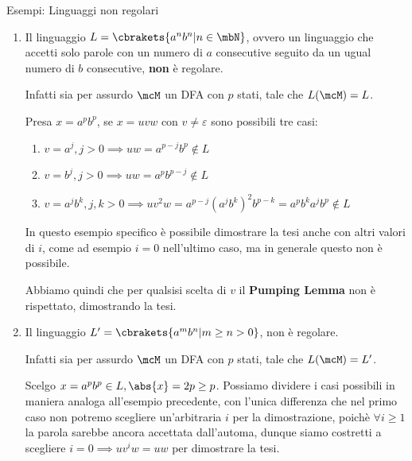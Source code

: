 \begin{generalbox}[colframe=azure-gradient-3!90!black]{Esempi: Linguaggi non regolari}

  \begin{enumerate}
    \item Il linguaggio \(L = \cbrakets{a^{n}b^n \vert n \in \mbN}\), ovvero un linguaggio che accetti solo parole con un numero di \(a\) consecutive seguito da un ugual numero di \(b\) consecutive, \textbf{non} è regolare.

          \medskip

          Infatti sia per assurdo \(\mcM\) un DFA con \(p\) stati, tale che \(L(\mcM)=L\).

          \medskip

          Presa \(x=a^{p}b^p\), se \(x=uvw\) con \(v\neq \varepsilon\) sono possibili tre casi:
          \begin{enumerate}
            \item \(v=a^j, j>0 \implies uw=a^{p-j}b^p \nin L\)
            \item \(v=b^j, j>0 \implies uw=a^{p}b^{p-j} \nin L\)
            \item \(v=a^{j}b^k, j,k>0 \implies uv^2w = a^{p-j}{(a^{j}b^k)}^2b^{p-k}=a^{p}b^{k}a^{j}b^p \nin L\)
          \end{enumerate}

          \medskip

          In questo esempio specifico è possibile dimostrare la tesi anche con altri valori di \(i\), come ad esempio \(i=0\) nell'ultimo caso, ma in generale questo non è possibile.

          \medskip

          Abbiamo quindi che per qualsisi scelta di \(v\) il \textbf{Pumping Lemma} non è rispettato, dimostrando la tesi.

          \medskip

    \item Il linguaggio \(L' = \cbrakets{a^{m}b^n \vert m \geq n > 0}\), non è regolare.

          \medskip

          Infatti sia per assurdo \(\mcM\) un DFA con \(p\) stati, tale che \(L(\mcM)=L'\).

          \medskip

          Scelgo \(x=a^{p}b^{p} \in L, \abs{x}=2p\geq p\). Possiamo dividere i casi possibili in maniera analoga all'esempio precedente, con l'unica differenza che nel primo caso non potremo scegliere un'arbitraria \(i\) per la dimostrazione, poichè \( \forall i\geq 1\) la parola sarebbe ancora accettata dall'automa, dunque siamo costretti a scegliere \(i=0 \implies uv^{i}w = uw\) per dimostrare la tesi.


\end{enumerate}
\end{generalbox}
